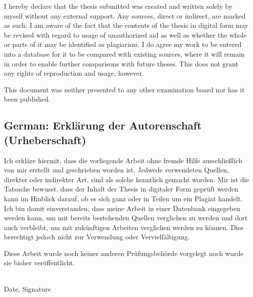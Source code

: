 \documentclass[11pt,a4paper]{report}
\begin{document}
I hereby declare that the thesis submitted was created and written
solely by myself without any external support. Any sources, direct
or indirect, are marked as such. I am aware of the fact that the
contents of the thesis in digital form may be revised with regard to
usage of unauthorized aid as well as whether the whole or parts of
it may be identified as plagiarism. I do agree my work to be entered
into a database for it to be compared with existing sources, where
it will remain in order to enable further comparisons with future
theses. This does not grant any rights of reproduction and usage,
however.

This document was neither presented to any other examination board
nor has it been published.

\subsection*{German: Erklärung der Autorenschaft (Urheberschaft)}

Ich erkläre hiermit, dass die vorliegende Arbeit ohne fremde Hilfe
ausschließlich von mir erstellt und geschrieben worden ist. Jedwede
verwendeten Quellen, direkter oder indirekter Art, sind als solche
kenntlich gemacht worden. Mir ist die Tatsache bewusst, dass der
Inhalt der Thesis in digitaler Form geprüft werden kann im Hinblick
darauf, ob es sich ganz oder in Teilen um ein Plagiat handelt. Ich
bin damit einverstanden, dass meine Arbeit in einer Datenbank
eingegeben werden kann, um mit bereits bestehenden Quellen
verglichen zu werden und dort auch verbleibt, um mit zukünftigen
Arbeiten verglichen werden zu können. Dies berechtigt jedoch nicht
zur Verwendung oder Vervielfältigung.

Diese Arbeit wurde noch keiner anderen Prüfungsbehörde vorgelegt
noch wurde sie bisher veröffentlicht.

\vspace{20mm}

\dotfill\\
Date, Signature

\newpage
\end{document}
